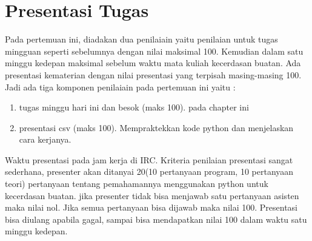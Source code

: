\section{Presentasi Tugas}
Pada pertemuan ini, diadakan dua penilaiain yaitu penilaian untuk tugas mingguan seperti sebelumnya dengan nilai maksimal 100. Kemudian dalam satu minggu kedepan maksimal sebelum waktu mata kuliah kecerdasan buatan. Ada presentasi kematerian dengan nilai presentasi yang terpisah masing-masing 100. Jadi ada tiga komponen penilaiain pada pertemuan ini yaitu :
\begin{enumerate}
	\item tugas minggu hari ini dan besok (maks 100). pada chapter ini
	\item presentasi csv (maks 100). Mempraktekkan kode python dan menjelaskan cara kerjanya.
\end{enumerate}
Waktu presentasi pada jam kerja di IRC. Kriteria penilaian presentasi sangat sederhana, presenter akan ditanyai 20(10 pertanyaan program, 10 pertanyaan teori) pertanyaan tentang pemahamannya menggunakan python untuk kecerdasan buatan. jika presenter tidak bisa menjawab satu pertanyaan asisten maka nilai nol. Jika semua pertanyaan bisa dijawab maka nilai 100. Presentasi bisa diulang apabila gagal, sampai bisa mendapatkan nilai 100 dalam waktu satu minggu kedepan.




